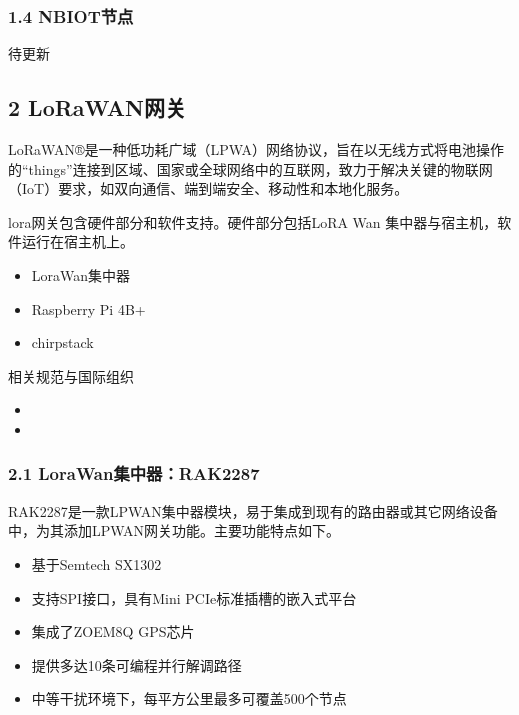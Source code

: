 \documentclass[a4paper,12pt,english]{sphinxmanual}
\begin{document}
\subsubsection{1.4 NB\sphinxhyphen{}IOT节点}
\label{\detokenize{dev-board/arch:nb-iot}}
\sphinxAtStartPar
待更新


\subsection{2 LoRaWAN网关}
\label{\detokenize{dev-board/arch:lorawan}}
\sphinxAtStartPar
LoRaWAN®是一种低功耗广域（LPWA）网络协议，旨在以无线方式将电池操作的“things”连接到区域、国家或全球网络中的互联网，致力于解决关键的物联网（IoT）要求，如双向通信、端到端安全、移动性和本地化服务。

\sphinxAtStartPar
lora网关包含硬件部分和软件支持。硬件部分包括LoRA Wan 集中器与宿主机，软件运行在宿主机上。
\begin{itemize}
\item {} 
\sphinxAtStartPar
LoraWan集中器

\item {} 
\sphinxAtStartPar
Raspberry Pi 4B+

\item {} 
\sphinxAtStartPar
chirpstack

\end{itemize}

\sphinxAtStartPar
相关规范与国际组织
\begin{itemize}
\item {} 
\sphinxAtStartPar
{}

\item {} 
\sphinxAtStartPar
{}

\end{itemize}


\subsubsection{2.1 LoraWan集中器：RAK2287}
\label{\detokenize{dev-board/arch:lorawan-rak2287}}
\sphinxAtStartPar
{}

\sphinxAtStartPar
RAK2287是一款LPWAN集中器模块，易于集成到现有的路由器或其它网络设备中，为其添加LPWAN网关功能。主要功能特点如下。
\begin{itemize}
\item {} 
\sphinxAtStartPar
基于Semtech SX1302

\item {} 
\sphinxAtStartPar
支持SPI接口，具有Mini PCI\sphinxhyphen{}e标准插槽的嵌入式平台

\item {} 
\sphinxAtStartPar
集成了ZOE\sphinxhyphen{}M8Q GPS芯片

\item {} 
\sphinxAtStartPar
提供多达10条可编程并行解调路径

\item {} 
\sphinxAtStartPar
中等干扰环境下，每平方公里最多可覆盖500个节点

\end{itemize}
\end{document}
